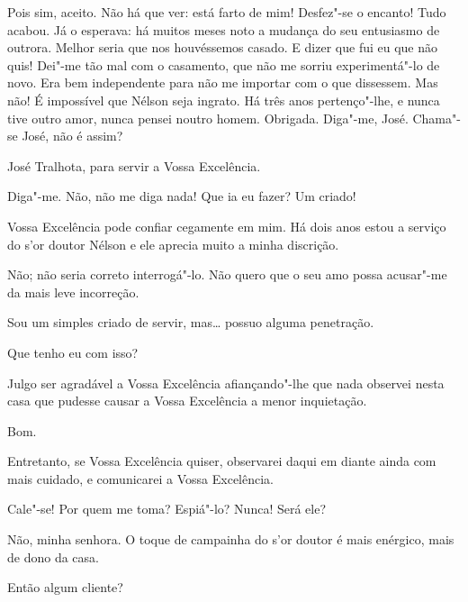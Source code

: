   Pois sim, aceito.  Não há que ver: está farto de
mim! Desfez"-se o encanto! Tudo acabou. Já o esperava: há muitos meses
noto a mudança do seu entusiasmo de outrora. Melhor seria que nos
houvéssemos casado. E dizer que fui eu que não quis! Dei"-me tão mal com
o casamento, que não me sorriu experimentá"-lo de novo. Era bem
independente para não me importar com o que dissessem.
Mas não! É impossível que Nélson seja ingrato. Há três anos
pertenço"-lhe, e nunca tive outro amor, nunca pensei noutro homem.
Obrigada.  Diga"-me, José.  Chama"-se
José, não é assim?

  José Tralhota, para servir a Vossa Excelência.

 Diga"-me.  Não, não me diga
nada!  Que ia eu fazer? Um criado!

  Vossa Excelência pode confiar cegamente em mim. Há dois anos
estou a serviço do s'or doutor Nélson e ele aprecia
muito a minha discrição.

  Não; não seria correto interrogá"-lo. Não quero que o seu amo
possa acusar"-me da mais leve incorreção.

  Sou um simples criado de servir, mas\ldots{} possuo alguma
penetração.

  Que tenho eu com isso?

  Julgo ser agradável a Vossa Excelência afiançando"-lhe
que nada observei nesta casa que pudesse causar a Vossa Excelência a
menor inquietação.

  Bom.

  Entretanto, se Vossa Excelência quiser, observarei daqui
em diante ainda com mais cuidado, e comunicarei a Vossa Excelência.

  Cale"-se! Por quem me toma? Espiá"-lo? Nunca!
 Será ele?

  Não, minha senhora. O toque de campainha do
s'or doutor é mais enérgico, mais de dono da casa.

  Então algum cliente?

